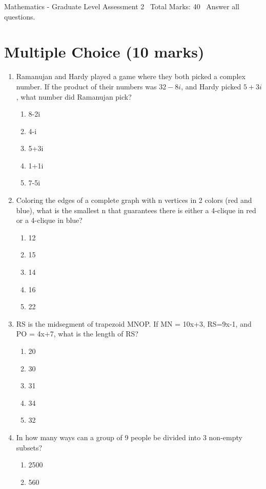 \documentclass[12pt]{article}
\begin{document}
\begin{center}
Mathematics - Graduate Level Assessment 2 \
Total Marks: 40 \
Answer all questions.
\end{center}

\section*{Multiple Choice (10 marks)}
\begin{enumerate}[label=\arabic*.]
\item Ramanujan and Hardy played a game where they both picked a complex number. If the product
of their numbers was $32-8i$, and Hardy picked $5+3i$, what number did Ramanujan pick?
\begin{enumerate}[label=(\alph*)]
    \item 8-2i
    \item 4-i
    \item 5+3i
    \item 1+1i
    \item 7-5i
\end{enumerate}
\item Coloring the edges of a complete graph with n vertices in 2 colors (red and blue), what is
the smallest n that guarantees there is either a 4-clique in red or a 4-clique in blue?
\begin{enumerate}[label=(\alph*)]
    \item 12
    \item 15
    \item 14
    \item 16
    \item 22
\end{enumerate}
\item RS is the midsegment of trapezoid MNOP. If MN = 10x+3, RS=9x-1, and PO = 4x+7, what is the
length of RS?
\begin{enumerate}[label=(\alph*)]
    \item 20
    \item 30
    \item 31
    \item 34
    \item 32
\end{enumerate}
\item In how many ways can a group of 9 people be divided into 3 non-empty subsets?
\begin{enumerate}[label=(\alph*)]
    \item 2500
    \item 560

\end{enumerate}
\end{enumerate}
\end{document}
